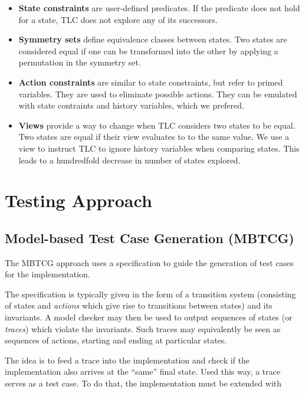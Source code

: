 \documentclass[a4paper]{article}
\begin{document}
\begin{itemize}
    \item \textbf{State constraints} are user-defined predicates.
    If the predicate does not hold for a state, TLC does not explore any of its successors.

    \item \textbf{Symmetry sets} define equivalence classes between states.
    Two states are considered equal if one can be transformed into the other by applying a permutation in the symmetry set.

    \item \textbf{Action constraints} are similar to state constraints, but refer to primed variables.
    They are used to eliminate possible actions.
    They can be emulated with state contraints and history variables, which we prefered.
    
    \item \textbf{Views} provide a way to change when TLC considers two states to be equal.
    Two states are equal if their view evaluates to to the same value.
    We use a view to instruct TLC to ignore history variables when comparing states.
    This leads to a hundredfold decrease in number of states explored.

\end{itemize}

\section{Testing Approach}

\subsection{Model-based Test Case Generation (MBTCG)}
\label{sec: interpreter}

The MBTCG approach uses a specification to guide the generation of test cases for the implementation.

The specification is typically given in the form of a transition system (consisting of states and \emph{actions} which give rise to transitions between states) and its invariants.
%
A model checker may then be used to output sequences of states (or \emph{traces}) which violate the invariants.
%
Such traces may equivalently be seen as sequences of actions, starting and ending at particular states.

The idea is to feed a trace into the implementation and check if the implementation also arrives at the ``same'' final state. Used this way, a trace serves as a test case.
%
To do that, the implementation must be extended with
\end{document}
